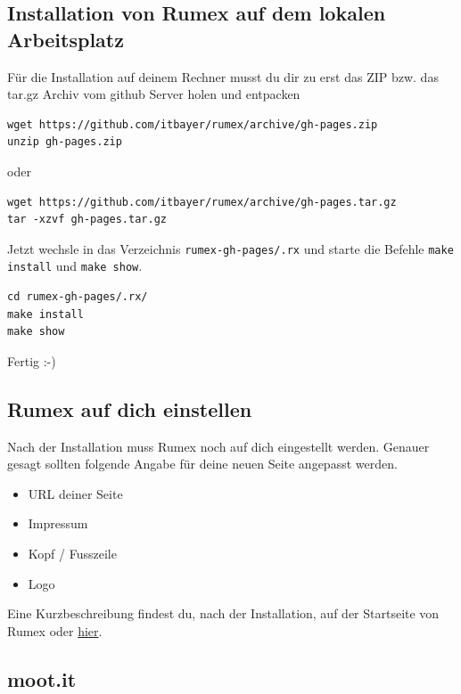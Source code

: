 \documentclass[%
fontsize=12pt,%
parskip=half,%
version=last%
]{scrreprt}
\begin{document}
\subsection{Installation von Rumex auf dem lokalen
Arbeitsplatz}\label{installation-von-rumex-auf-dem-lokalen-arbeitsplatz}

Für die Installation auf deinem Rechner musst du dir zu erst das ZIP
bzw. das tar.gz Archiv vom github Server holen und entpacken

\begin{verbatim}
wget https://github.com/itbayer/rumex/archive/gh-pages.zip
unzip gh-pages.zip
\end{verbatim}

oder

\begin{verbatim}
wget https://github.com/itbayer/rumex/archive/gh-pages.tar.gz
tar -xzvf gh-pages.tar.gz
\end{verbatim}

Jetzt wechsle in das Verzeichnis \texttt{rumex-gh-pages/.rx} und starte
die Befehle \texttt{make install} und \texttt{make show}.

\begin{verbatim}
cd rumex-gh-pages/.rx/
make install
make show
\end{verbatim}

Fertig :-)

\subsection{Rumex auf dich einstellen}\label{rumex-auf-dich-einstellen}

Nach der Installation muss Rumex noch auf dich eingestellt werden.
Genauer gesagt sollten folgende Angabe für deine neuen Seite angepasst
werden.

\begin{itemize}
\itemsep1pt\parskip0pt
\item
  URL deiner Seite
\item
  Impressum
\item
  Kopf / Fusszeile
\item
  Logo
\end{itemize}

Eine Kurzbeschreibung findest du, nach der Installation, auf der
Startseite von Rumex oder \href{../istart.html}{hier}.

\subsection{moot.it}\label{moot.it}
\end{document}
